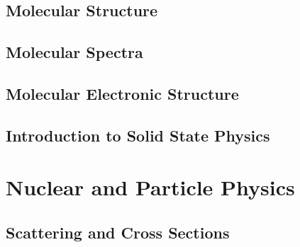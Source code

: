 \documentclass[a4paper, 11pt]{book}
\newcommand{\1}{\opr{\mathds{1}}}
\begin{document}
	\chapter{Molecular Structure}
		
	\chapter{Molecular Spectra}
		
	\chapter{Molecular Electronic Structure}
		
	\chapter{Introduction to Solid State Physics}
		
%		
%		
%		
%		
%		
\part{Nuclear and Particle Physics}
	\chapter{Scattering and Cross Sections}
	
\end{document}
